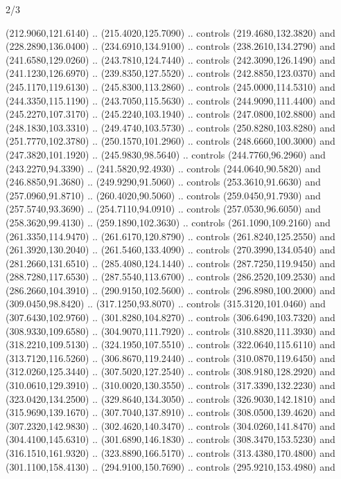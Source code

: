 \begin{flagdescription}{2/3}
\begin{scope}[shift={(0.5\flaglength,0.5)},scale=\flagwidth/320]
\begin{scope}[y=-0.8pt, x=0.8,shift={(-300,-200)}]
\begin{scope}[cm={{1.01189,0.0,0.0,1.01189,(47.01467,48.21687)}}]
  (212.9060,121.6140) .. (215.4020,125.7090) .. controls (219.4680,132.3820) and
  (228.2890,136.0400) .. (234.6910,134.9100) .. controls (238.2610,134.2790) and
  (241.6580,129.0260) .. (243.7810,124.7440) .. controls (242.3090,126.1490) and
  (241.1230,126.6970) .. (239.8350,127.5520) .. controls (242.8850,123.0370) and
  (245.1170,119.6130) .. (245.8300,113.2860) .. controls (245.0000,114.5310) and
  (244.3350,115.1190) .. (243.7050,115.5630) .. controls (244.9090,111.4400) and
  (245.2270,107.3170) .. (245.2240,103.1940) .. controls (247.0800,102.8800) and
  (248.1830,103.3310) .. (249.4740,103.5730) .. controls (250.8280,103.8280) and
  (251.7770,102.3780) .. (250.1570,101.2960) .. controls (248.6660,100.3000) and
  (247.3820,101.1920) .. (245.9830,98.5640) .. controls (244.7760,96.2960) and
  (243.2270,94.3390) .. (241.5820,92.4930) .. controls (244.0640,90.5820) and
  (246.8850,91.3680) .. (249.9290,91.5060) .. controls (253.3610,91.6630) and
  (257.0960,91.8710) .. (260.4020,90.5060) .. controls (259.0450,91.7930) and
  (257.5740,93.3690) .. (254.7110,94.0910) .. controls (257.0530,96.6050) and
  (258.3620,99.4130) .. (259.1890,102.3630) .. controls (261.1090,109.2160) and
  (261.3350,114.9470) .. (261.6170,120.8790) .. controls (261.8240,125.2550) and
  (261.3920,130.2040) .. (261.5460,133.4090) .. controls (270.3990,134.0540) and
  (281.2660,131.6510) .. (285.4080,124.1440) .. controls (287.7250,119.9450) and
  (288.7280,117.6530) .. (287.5540,113.6700) .. controls (286.2520,109.2530) and
  (286.2660,104.3910) .. (290.9150,102.5600) .. controls (296.8980,100.2000) and
  (309.0450,98.8420) .. (317.1250,93.8070) .. controls (315.3120,101.0460) and
  (307.6430,102.9760) .. (301.8280,104.8270) .. controls (306.6490,103.7320) and
  (308.9330,109.6580) .. (304.9070,111.7920) .. controls (310.8820,111.3930) and
  (318.2210,109.5130) .. (324.1950,107.5510) .. controls (322.0640,115.6110) and
  (313.7120,116.5260) .. (306.8670,119.2440) .. controls (310.0870,119.6450) and
  (312.0260,125.3440) .. (307.5020,127.2540) .. controls (308.9180,128.2920) and
  (310.0610,129.3910) .. (310.0020,130.3550) .. controls (317.3390,132.2230) and
  (323.0420,134.2500) .. (329.8640,134.3050) .. controls (326.9030,142.1810) and
  (315.9690,139.1670) .. (307.7040,137.8910) .. controls (308.0500,139.4620) and
  (307.2320,142.9830) .. (302.4620,140.3470) .. controls (304.0260,141.8470) and
  (304.4100,145.6310) .. (301.6890,146.1830) .. controls (308.3470,153.5230) and
  (316.1510,161.9320) .. (323.8890,166.5170) .. controls (313.4380,170.4800) and
  (301.1100,158.4130) .. (294.9100,150.7690) .. controls (295.9210,153.4980) and

\end{scope}
\end{scope}
\end{scope}
\end{flagdescription}
